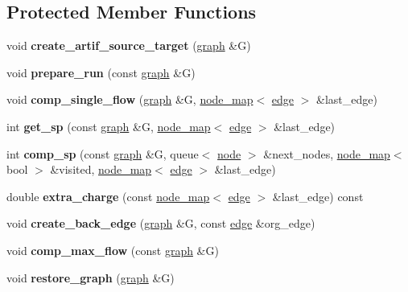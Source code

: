 \subsection*{Protected Member Functions}
\begin{DoxyCompactItemize}
\item 
\mbox{\label{classmaxflow__ff_ad2634e4325012773d793e9cf8f1a3dcf}} 
void {\bfseries create\+\_\+artif\+\_\+source\+\_\+target} (\mbox{\hyperlink{classgraph}{graph}} \&G)
\item 
\mbox{\label{classmaxflow__ff_a8ad20b45a7d30070bb65e68758c2f7d3}} 
void {\bfseries prepare\+\_\+run} (const \mbox{\hyperlink{classgraph}{graph}} \&G)
\item 
\mbox{\label{classmaxflow__ff_a22a432bb072e0410f20bb418dfd4d3a9}} 
void {\bfseries comp\+\_\+single\+\_\+flow} (\mbox{\hyperlink{classgraph}{graph}} \&G, \mbox{\hyperlink{classnode__map}{node\+\_\+map}}$<$ \mbox{\hyperlink{classedge}{edge}} $>$ \&last\+\_\+edge)
\item 
\mbox{\label{classmaxflow__ff_a532b1285a791d23ab318791bc093fde7}} 
int {\bfseries get\+\_\+sp} (const \mbox{\hyperlink{classgraph}{graph}} \&G, \mbox{\hyperlink{classnode__map}{node\+\_\+map}}$<$ \mbox{\hyperlink{classedge}{edge}} $>$ \&last\+\_\+edge)
\item 
\mbox{\label{classmaxflow__ff_a3a9d93d6796ae0846d0137aa46f29c30}} 
int {\bfseries comp\+\_\+sp} (const \mbox{\hyperlink{classgraph}{graph}} \&G, queue$<$ \mbox{\hyperlink{classnode}{node}} $>$ \&next\+\_\+nodes, \mbox{\hyperlink{classnode__map}{node\+\_\+map}}$<$ bool $>$ \&visited, \mbox{\hyperlink{classnode__map}{node\+\_\+map}}$<$ \mbox{\hyperlink{classedge}{edge}} $>$ \&last\+\_\+edge)
\item 
\mbox{\label{classmaxflow__ff_a410a7c5b9b75225ec0a48402dc2f6555}} 
double {\bfseries extra\+\_\+charge} (const \mbox{\hyperlink{classnode__map}{node\+\_\+map}}$<$ \mbox{\hyperlink{classedge}{edge}} $>$ \&last\+\_\+edge) const
\item 
\mbox{\label{classmaxflow__ff_aea04831f46fb86990c9ba21fb19d0382}} 
void {\bfseries create\+\_\+back\+\_\+edge} (\mbox{\hyperlink{classgraph}{graph}} \&G, const \mbox{\hyperlink{classedge}{edge}} \&org\+\_\+edge)
\item 
\mbox{\label{classmaxflow__ff_a560d27c4c62b46dcb0a36ac60ebc1efb}} 
void {\bfseries comp\+\_\+max\+\_\+flow} (const \mbox{\hyperlink{classgraph}{graph}} \&G)
\item 
\mbox{\label{classmaxflow__ff_a31a13c79918964a49fa18b4eb514c584}} 
void {\bfseries restore\+\_\+graph} (\mbox{\hyperlink{classgraph}{graph}} \&G)
\end{DoxyCompactItemize}
